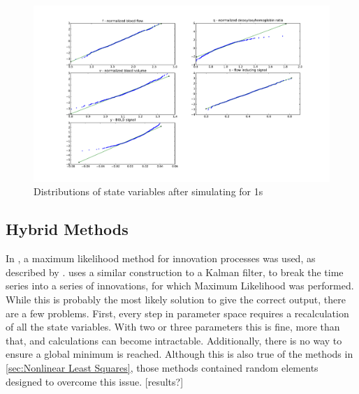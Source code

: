 \begin{figure}
\includegraphics[trim=6cm .75cm 6cm .75cm,width=16cm]{images/gauss_step_1sec_3sigma.pdf}
\caption{Distributions of state variables after simulating for 1s}
\label{fig:trans1s}
\end{figure}

\subsection{Hybrid Methods}
In \cite{Riera2004}, a maximum
likelihood method for innovation processes was used, as described by
\cite{Ozaki1994}. \cite{Ozaki1994} uses a similar construction to a 
Kalman filter, to break the time series into a series of innovations,
for which Maximum Likelihood was performed. While this is probably the most
likely solution to give the correct output, there are a few problems. First, every
step in parameter space requires a recalculation of all the state variables. With
two or three parameters this is fine, more than that, and calculations can become
intractable. Additionally, there is no way to ensure a global minimum is reached.
Although this is also true of the methods in \autoref{sec:Nonlinear Least Squares},
those methods contained random elements designed to overcome this issue.
[results?]

